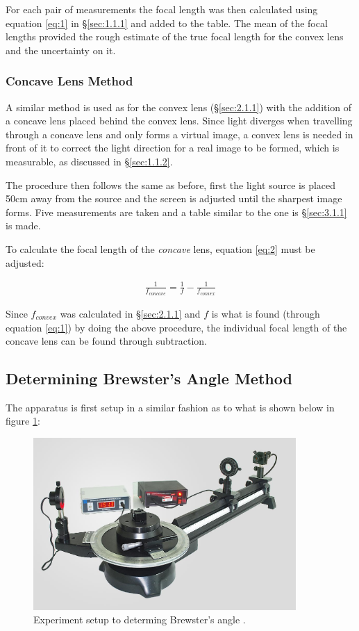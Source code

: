 \documentclass[12pt]{article}
\begin{document}
For each pair of measurements the focal length was then calculated using equation \ref{eq:1} in §\ref{sec:1.1.1} and added to the table.
The mean of the focal lengths provided the rough estimate of the true focal length for the convex lens and the uncertainty on it.

\subsubsection{Concave Lens Method} \label{sec:2.1.2}

A similar method is used as for the convex lens (§\ref{sec:2.1.1}) with the addition of a concave lens placed behind the convex lens.
Since light diverges when travelling through a concave lens and only forms a virtual image, a convex lens is needed in front of it to correct the light direction for a real image to be formed, which is measurable, as discussed in §\ref{sec:1.1.2}.

The procedure then follows the same as before, first the light source is placed 50cm away from the source and the screen is adjusted until the sharpest image forms.
Five measurements are taken and a table similar to the one is §\ref{sec:3.1.1} is made.

To calculate the focal length of the \textit{concave} lens, equation \ref{eq:2} must be adjusted:

\begin{gather} \label{eq:9}
    \frac{1}{f_{concave}} = \frac{1}{f} - \frac{1}{f_{convex}}
\end{gather}

Since $f_{convex}$ was calculated in §\ref{sec:2.1.1} and $f$ is what is found (through equation \ref{eq:1}) by doing the above procedure, the individual focal
length of the concave lens can be found through subtraction.

\subsection{Determining Brewster's Angle Method} \label{sec:2.2}

The apparatus is first setup in a similar fashion as to what is shown below in figure \ref{fig:brewexp}:

\begin{figure}[H]
    \centering
    \includegraphics[width=10cm]{brewster exp.png}
    \caption{\centering Experiment setup to determing Brewster's angle \protect\cite{holmarcexp}.}
    \label{fig:brewexp}
\end{figure}
\end{document}
